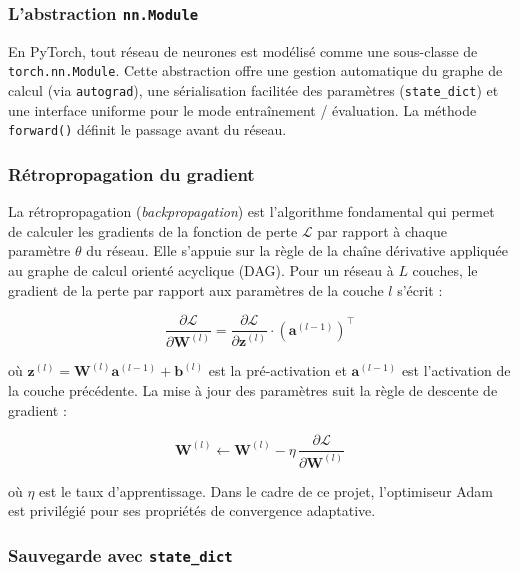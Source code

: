 \documentclass[11pt,a4paper]{article}
\begin{document}
\subsubsection{L'abstraction \texttt{nn.Module}}

En PyTorch, tout réseau de neurones est modélisé comme une sous-classe de
\texttt{torch.nn.Module}. Cette abstraction offre une gestion automatique du
graphe de calcul (via \texttt{autograd}), une sérialisation facilitée des paramètres
(\texttt{state\_dict}) et une interface uniforme pour le mode entraînement / évaluation.
La méthode \texttt{forward()} définit le passage avant du réseau.

\subsubsection{Rétropropagation du gradient}

La rétropropagation (\textit{backpropagation}) est l'algorithme fondamental qui permet
de calculer les gradients de la fonction de perte $\mathcal{L}$ par rapport à chaque
paramètre $\theta$ du réseau. Elle s'appuie sur la règle de la chaîne dérivative appliquée
au graphe de calcul orienté acyclique (DAG). Pour un réseau à $L$ couches, le gradient
de la perte par rapport aux paramètres de la couche $l$ s'écrit :

\begin{equation}
  \frac{\partial \mathcal{L}}{\partial \mathbf{W}^{(l)}} =
  \frac{\partial \mathcal{L}}{\partial \mathbf{z}^{(l)}} \cdot
  \left(\mathbf{a}^{(l-1)}\right)^\top
  \label{eq:backprop}
\end{equation}

où $\mathbf{z}^{(l)} = \mathbf{W}^{(l)} \mathbf{a}^{(l-1)} + \mathbf{b}^{(l)}$ est
la pré-activation et $\mathbf{a}^{(l-1)}$ est l'activation de la couche précédente.
La mise à jour des paramètres suit la règle de descente de gradient :

\begin{equation}
  \mathbf{W}^{(l)} \leftarrow \mathbf{W}^{(l)} - \eta \,
  \frac{\partial \mathcal{L}}{\partial \mathbf{W}^{(l)}}
  \label{eq:sgd}
\end{equation}

où $\eta$ est le taux d'apprentissage. Dans le cadre de ce projet, l'optimiseur Adam
\cite{kingma2014adam} est privilégié pour ses propriétés de convergence adaptative.

\subsubsection{Sauvegarde avec \texttt{state\_dict}}
\end{document}
